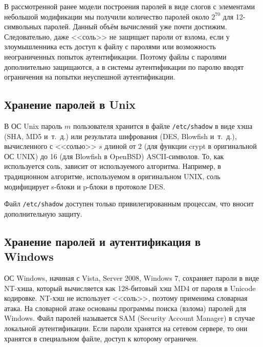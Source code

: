 В рассмотренной ранее модели построения паролей в виде слогов с элементами небольшой модификации мы получили количество паролей около $2^{70}$ для 12-символьных паролей. Данный объём вычислений уже почти достижим. Следовательно, даже <<соль>> не защищает пароли от взлома, если у злоумышленника есть доступ к файлу с паролями или возможность неограниченных попыток аутентификации. Поэтому файлы с паролями дополнительно защищаются, а в системы аутентификации по паролю вводят ограничения на попытки неуспешной аутентификации.

\subsection[Unix]{Хранение паролей в Unix}

В ОС Unix пароль $m$ пользователя хранится в файле \texttt{/etc/shadow} в виде хэша (SHA, MD5 и~т.~д.) или результата шифрования (DES, Blowfish и~т.~д.), вычисленного с <<солью>> $s$ длиной от 2 (для функции crypt в оригинальной ОС UNIX) до 16 (для Blowfish в OpenBSD) ASCII-символов. То, как используется соль, зависит от используемого алгоритма. Например, в традиционном алгоритме, используемом в оригинальном UNIX, соль модифицирует s-блоки и p-блоки в протоколе DES.

Файл \texttt{/etc/shadow} доступен только привилегированным процессам, что вносит дополнительную защиту.


\subsection[Windows]{Хранение паролей и аутентификация в \protect\\ Windows}


ОС Windows, начиная с Vista, Server 2008, Windows 7, сохраняет пароли в виде NT-хэша, который вычисляется как 128-битовый хэш MD4 от пароля в Unicode кодировке. NT-хэш не использует <<соль>>, поэтому применима словарная атака. На словарной атаке основаны программы поиска (взлома) паролей для Windows. Файл паролей называется SAM (Security Account Manager) в случае локальной аутентификации. Если пароли хранятся на сетевом сервере, то они хранятся в специальном файле, доступ к которому ограничен.


